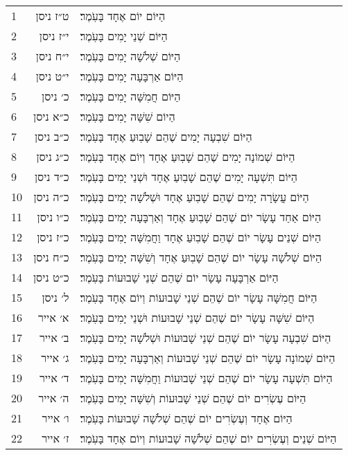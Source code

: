 \documentclass[twoside, openany, parskip=half, 11pt]{book}
\begin{document}
\begin{scriptsize}
\begin{longtable}{ l | r | p{} }
1 & ט״ז ניסן & הַיּוֹם יוֹם אֶחָד בָּעֹֽמֶר׃ \\
2 & י״ז ניסן & הַיּוֹם שְׁנֵי יָמִים בָּעֹֽמֶר׃ \\
3 & י״ח ניסן & הַיּוֹם שְׁלֹשָׁה יָמִים בָּעֹֽמֶר׃ \\
4 & י״ט ניסן & הַיּוֹם אַרְבָּעָה יָמִים בָּעֹֽמֶר׃ \\
5 & כ׳ ניסן & הַיּוֹם חֲמִשָּׁה יָמִים בָּעֹֽמֶר׃ \\
6 & כ״א ניסן & הַיוֹם שִׁשָּׁה יָמִים בָּעֹֽמֶר׃ \\
7 & כ״ב ניסן & הַיּוֹם שִׁבְעָה יָמִים שֶׁהֵם שָׁבֽוּעַ אֶחָד בָּעֹֽמֶר׃ \\
8 & כ״ג ניסן & הַיּוֹם שְׁמוֹנָה יָמִים שֶׁהֵם שָׁבֽוּעַ אֶחָד וְיוֹם אֶחָד בָּעֹֽמֶר׃ \\
9 & כ״ד ניסן & הַיּוֹם תִּשְׁעָה יָמִים שֶׁהֵם שָׁבֽוּעַ אֶחָד וּשְׁנֵי יָמִים בָּעֹֽמֶר׃ \\
10 & כ״ה ניסן & הַיּוֹם עֲשָׂרָה יָמִים שֶׁהֵם שָׁבֽוּעַ אֶחָד וּשְׁלֹשָׁה יָמִים בָּעֹֽמֶר׃ \\
11 & כ״ו ניסן & הַיּוֹם אַחַד עָשָׂר יוֹם שֶׁהֵם שָׁבֽוּעַ אֶחָד וְאַרְבָּעָה יָמִים בָּעֹֽמֶר׃ \\
12 & כ״ז ניסן & הַיּוֹם שְׁנֵים עָשָׂר יוֹם שֶׁהֵם שָׁבֽוּעַ אֶחָד וַחֲמִשָּׁה יָמִים בָּעֹֽמֶר׃ \\
13 & כ״ח ניסן & הַיּוֹם שְׁלֹשָׁה עָשָׂר יוֹם שֶׁהֵם שָׁבֽוּעַ אֶחָד וְשִׁשָּׁה יָמִים בָּעֹֽמֶר׃ \\
14 & כ״ט ניסן & הַיּוֹם אַרְבָּעָה עָשָׂר יוֹם שֶׁהֵם שְׁנֵי שָׁבוּעוֹת בָּעֹֽמֶר׃ \\
15 & ל׳ ניסן & הַיּוֹם חֲמִשָּׁה עָשָׂר יוֹם שֶׁהֵם שְׁנֵי שָׁבוּעוֹת וְיוֹם אֶחָד בָּעֹֽמֶר׃ \\
16 & א׳ אייר & הַיּוֹם שִׁשָּׁה עָשָׂר יוֹם שֶׁהֵם שְׁנֵי שָׁבוּעוֹת וּשְׁנֵי יָמִים בָּעֹֽמֶר׃ \\
17 & ב׳ אייר & הַיּוֹם שִׁבְעָה עָשָׂר יוֹם שֶׁהֵם שְׁנֵי שָׁבוּעוֹת וּשְׁלֹשָׁה יָמִים בָּעֹֽמֶר׃ \\
18 & ג׳ אייר & הַיּוֹם שְׁמוֹנָה עָשָׂר יוֹם שֶׁהֵם שְׁנֵי שָׁבוּעוֹת וְאַרְבָּעָה יָמִים בָּעֹֽמֶר׃ \\
19 & ד׳ אייר & הַיּוֹם תִּשְׁעָה עָשָׂר יוֹם שֶׁהֵם שְׁנֵי שָׁבוּעוֹת וַחֲמִשָּׁה יָמִים בָּעֹֽמֶר׃ \\
20 & ה׳ אייר & הַיּוֹם עֶשְׂרִים יוֹם שֶׁהֵם שְׁנֵי שָׁבוּעוֹת וְשִׁשָּׁה יָמִים בָּעֹֽמֶר׃ \\
21 & ו׳ אייר & הַיּוֹם אֶחָד וְעֶשְׂרִים יוֹם שֶׁהֵם שְׁלֹשָׁה שָׁבוּעוֹת בָּעֹֽמֶר׃ \\
22 & ז׳ אייר & הַיּוֹם שְׁנֵים וְעֶשְׂרִים יוֹם שֶׁהֵם שְׁלֹשָׁה שָׁבוּעוֹת וְיוֹם אֶחָד בָּעֹֽמֶר׃ \\

\end{longtable}
\end{scriptsize}
\end{document}
